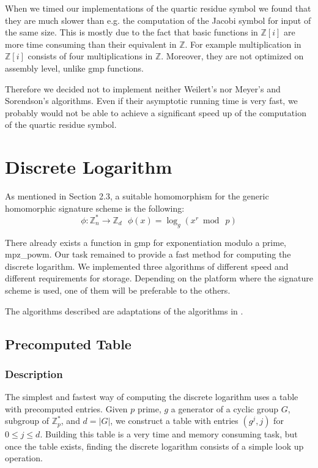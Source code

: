 \documentclass[a4paper, 11pt]{article}
\begin{document}
 When we timed our implementations of the quartic residue symbol we found that they are much slower than e.g. the computation of the Jacobi symbol for input of the same size. This is mostly due to the fact that basic functions in $\mathbb{Z}[i]$ are more time consuming  than their equivalent in $\mathbb{Z}$. For example multiplication in $\mathbb{Z}[i]$ consists of four multiplications in $\mathbb{Z}$. Moreover, they are not optimized on assembly level, unlike gmp functions. 
 
 Therefore we decided not to implement neither Weilert's nor Meyer's and Sorendson's algorithms. %
 Even if their asymptotic running time is very fast, we probably would not be able to achieve a significant speed up of the computation of the quartic residue symbol. 
 
 \section{Discrete Logarithm} 
 As mentioned in Section 2.3, a suitable homomorphism for the generic homomorphic signature scheme is the following: 
 \begin{displaymath} 
     \phi : \mathbb{Z}^{*}_{n} \to \mathbb{Z}_{d} ~~~\phi (x) = \log_g(x^r \bmod~ p) 
 \end{displaymath} 
 
 There already exists a function in gmp for exponentiation modulo a prime, \ttfamily mpz\_powm\normalfont. Our task remained to provide a fast method for computing the discrete logarithm. We implemented three algorithms of different speed and different requirements for storage. Depending on the platform where the signature scheme is used, one of them will be preferable to the others. 
 
 The algorithms described are adaptations of the algorithms in \cite{handbook}. 
 
 
 \subsection{Precomputed Table} 
 \subsubsection{Description} 
 The simplest and fastest way of computing the discrete logarithm uses a table with precomputed 
 entries. Given  $p$ prime, $g$ a generator of a cyclic group $G$, subgroup of $ \mathbb{Z}^{*}_p$, and $d = |G|$, we construct a table with entries $(g^j,j)$ for $0 \le j \le d$. Building this table is a very time and memory consuming task, but once the table exists, finding the discrete logarithm consists of a simple look up operation. 
 
\end{document}
